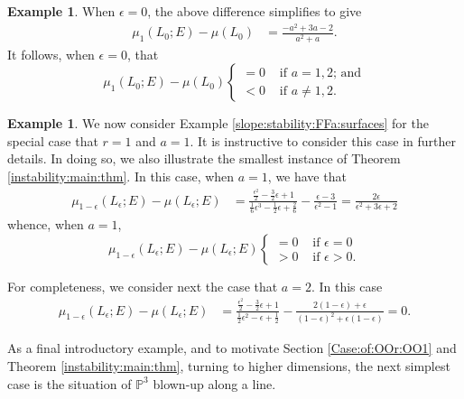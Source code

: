 \documentclass[10pt,letterpaper]{amsart}
\newcommand{\PP}{\mathbb{P}} %
\theoremstyle{definition}
\newtheorem{example}[theorem]{Example}
\numberwithin{equation}{section}
\begin{document}
\begin{example}
When $\epsilon = 0$, the above difference simplifies to give
\begin{align*}
\mu_{1 } (L_{0};E)- \mu(L_{0}) & = \frac{-a^{2}+3a-2}{a^{2}+a} \text{.}
\end{align*}
It follows, when $\epsilon = 0$, that
$$
\mu_{1 } (L_{0};E)- \mu(L_{0})  
\begin{cases}
= 0 & \text{ if $a =  1,2$; and} \\
< 0 & \text{ if $a \not =  1, 2$.}
\end{cases}
$$ 


\end{example}

\begin{example}\label{ex:r:1:a:1}
We now consider Example \ref{slope:stability:FFa:surfaces} for the special case that $r = 1$ and $a = 1$.  It is instructive to consider this case in further details.  In doing so, we also illustrate the smallest instance of Theorem \ref{instability:main:thm}.   
In this case, when $a = 1$, we have that
\begin{align*}
\mu_{1 - \epsilon} (L_{\epsilon};E) - \mu(L_{\epsilon};E) & = 
\frac{\frac{\epsilon^2}{2} - \frac{3}{2} \epsilon + 1}{\frac{1}{6}\epsilon^3 - \frac{1}{2}\epsilon + \frac{2}{6}} - \frac{\epsilon - 3}{\epsilon^2 - 1}  =  \frac{2 \epsilon}{\epsilon^2 + 3 \epsilon + 2} 
\end{align*}
whence, when $a = 1$,
$$
\mu_{1 - \epsilon} (L_{\epsilon};E) - \mu(L_{\epsilon};E) \begin{cases} 
= 0 & \text{ if $\epsilon = 0$} \\
> 0 & \text{ if $\epsilon > 0$.}
\end{cases}
$$

For completeness, we consider next the case that $a = 2$.  In this case
\begin{align*}
\mu_{1 - \epsilon} (L_{\epsilon};E) - \mu(L_{\epsilon};E) & = 
\frac{\frac{\epsilon^2}{2}-\frac{3}{2}\epsilon+1}{\frac{1}{2}\epsilon^2-\epsilon+\frac{1}{2}} - \frac{2(1-\epsilon)+\epsilon}{(1-\epsilon)^2+\epsilon(1-\epsilon)}  = 0 \text{.}
\end{align*}
\end{example}

As a final introductory example, and to motivate Section \ref{Case:of:OOr:OO1} and Theorem \ref{instability:main:thm},  turning to higher dimensions, the next simplest case is the situation of $\PP^3$ blown-up along a line.  
\end{document}

